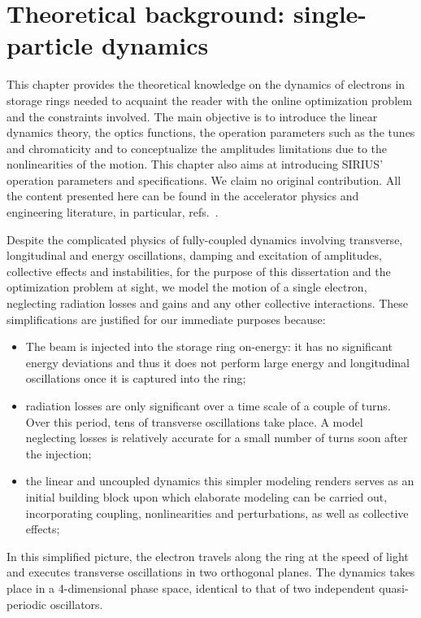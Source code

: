 \chapter{Theoretical background: single-particle dynamics}
This chapter provides the theoretical knowledge on the dynamics of electrons in storage rings needed to acquaint the reader with the online optimization problem and the constraints involved. The main objective is to introduce the linear dynamics theory, the optics functions, the operation parameters such as the tunes and chromaticity and to conceptualize the amplitudes limitations due to the nonlinearities of the motion. This chapter also aims at introducing SIRIUS' operation parameters and specifications. We claim no original contribution. All the content presented here can be found in the accelerator physics and engineering literature, in particular, refs.~\cite{sands_physics_1969,lee_accelerator_2004,wiedemann_particle_2015,wolski_beam_2014}.

Despite the complicated physics of fully-coupled dynamics involving transverse, longitudinal and energy oscillations, damping and excitation of amplitudes, collective effects and instabilities, for the purpose of this dissertation and the optimization problem at sight, we model the motion of a single electron, neglecting radiation losses and gains and any other collective interactions. These simplifications are justified for our immediate purposes because:
\begin{itemize}
    \item The beam is injected into the storage ring on-energy: it has no significant energy deviations and thus it does not perform large energy and longitudinal oscillations once it is captured into the ring;
    \item radiation losses are only significant over a time scale of a couple of turns. Over this period, tens of transverse oscillations take place. A model neglecting losses is relatively accurate for a small number of turns soon after the injection;
    \item the linear and uncoupled dynamics this simpler modeling renders serves as an initial building block upon which elaborate modeling can be carried out, incorporating coupling, nonlinearities and perturbations, as well as collective effects;
\end{itemize}
In this simplified picture, the electron travels along the ring at the speed of light and executes transverse oscillations in two orthogonal planes. The dynamics takes place in a 4-dimensional phase space, identical to that of two independent quasi-periodic oscillators.

